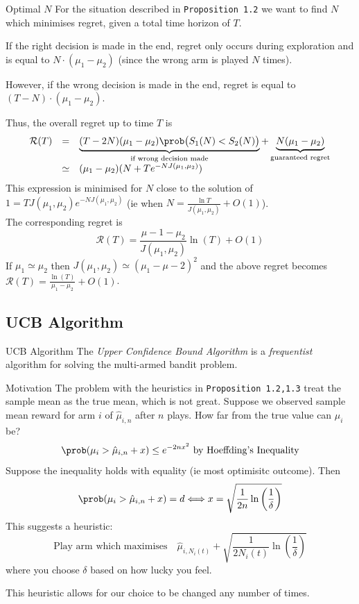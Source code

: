 \documentclass[11pt,a4paper]{article}
\begin{document}
\begin{proposition}{Optimal $N$}
  For the situation described in \texttt{Proposition 1.2} we want to find $N$ which minimises regret, given a total time horizon of $T$.
  \par If the right decision is made in the end, regret only occurs during exploration and is equal to $N\cdot(\mu_1-\mu_2)$ (since the wrong arm is played $N$ times).
  \par However, if the wrong decision is made in the end, regret is equal to $(T-N)\cdot(\mu_1-\mu_2)$.
  \par Thus, the overall regret up to time $T$ is
  \[\begin{array}{rcl}
    \mathcal{R}(T)&=&\underbrace{(T-2N)(\mu_1-\mu_2)\prob\big(S_1(N)<S_2(N)\big)}_{\tiny\text{if wrong decision made}}+\underbrace{N(\mu_1-\mu_2)}_{\tiny\text{guaranteed regret}}\\
    &\simeq&(\mu_1-\mu_2)(N+Te^{-NJ(\mu_1,\mu_2)})
  \end{array}\]
  This expression is minimised for $N$ close to the solution of $1=TJ(\mu_1,\mu_2)e^{-NJ(\mu_1,\mu_2)}$ (ie when $N=\frac{\ln T}{J(\mu_1,\mu_2)}+O(1)$).\\
  The corresponding regret is
  \[ \mathcal{R}(T)=\frac{\mu-1-\mu_2}{J(\mu_1,\mu_2)}\ln(T)+O(1) \]
  If $\mu_1\simeq\mu_2$ then $J(\mu_1,\mu_2)\simeq(\mu_1-\mu-2)^2$ and the above regret becomes $\mathcal{R}(T)=\frac{\ln(T)}{\mu_1-\mu_2}+O(1)$.
\end{proposition}

\subsection{UCB Algorithm}

\begin{remark}{UCB Algorithm}
  The \textit{Upper Confidence Bound Algorithm} is a \textit{frequentist} algorithm for solving the multi-armed bandit problem.
\end{remark}

\begin{remark}{Motivation}
  The problem with the heuristics in \texttt{Proposition 1.2,1.3} treat the sample mean as the true mean, which is not great.
  Suppose we observed sample mean reward for arm $i$ of $\hat\mu_{i,n}$ after $n$ plays. How far from the true value can $\mu_i$ be?
  \[ \prob(\mu_i>\hat\mu_{i,n}+x)\leq e^{-2nx^2}\text{ by Hoeffding's Inequality} \]
  Suppose the inequality holds with equality (ie most optimisitc outcome). Then
  \[ \prob(\mu_i>\hat\mu_{i,n}+x)=d\Longleftrightarrow x=\sqrt{\frac1{2n}\ln\left(\frac1\delta\right)} \]
  This suggests a heuristic:
  \[\text{Play arm which maximises}\quad\hat\mu_{i,N_{i}(t)}+\sqrt{\frac1{2N_i(t)}\ln\left(\frac1\delta\right)}\]
  where you choose $\delta$ based on how lucky you feel.
  \par This heuristic allows for our choice to be changed any number of times.
\end{remark}
\end{document}
